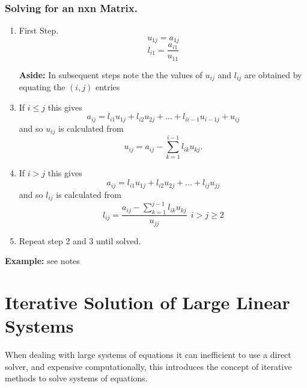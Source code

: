 \subsubsection*{Solving for an nxn Matrix.}
\begin{enumerate}
\item First Step.\[u_{1j}=a_{1j}\]
\[l_{i1}=\frac{a_{i1}}{u_{11}}\]
\item[\textbf{Aside:}]
In subsequent steps note the the values of $u_{ij}$ and $l_{ij}$ are obtained by equating
the $(i,j)$ entries
\item
If $i \leq j$ this gives 
\[a_{ij}= l_{i1}u_{1j}+ l_{i2}u_{2j}+ ...+l_{ii-1}u_{i-1j}+u_{ij}\]
and so $u_{ij}$ is calculated from
\[u_{ij}=a_{ij}-\sum_{k=1}^{i-1}l_{ik}u_{kj}.\]
\item
If $i > j$ this gives
\[a_{ij}= l_{i1}u_{1j}+ l_{i2}u_{2j}+ ...+l_{ij}u_{jj}\]
and so $l_{ij}$ is calculated from
\[ l_{ij} = \frac{a_{ij}-\sum_{k=1}^{j-1}l_{ik}u_{kj}}{u_{jj}} \ \ i>j\geq 2 \]
\item Repeat step 2 and 3 until solved.
\end{enumerate}
\textbf{Example:} see notes
\section{Iterative Solution of Large Linear Systems}
When dealing with large systems of equations it can inefficient to use a direct solver, and expensive computationally,
this introduces the concept of iterative methods to solve systems of equations.
